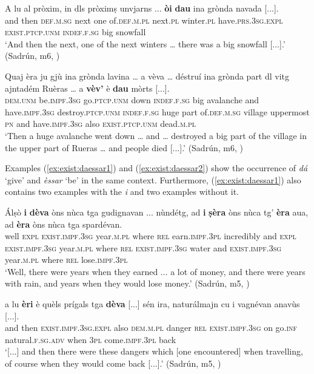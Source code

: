 \ea
\label{ex:exist.da5}
\gll    A lu al pròxim, in dls pròximṣ unvjarns ... \textbf{òi} \textbf{dau} ina grònda navada [...].\\
and then \textsc{def.m.sg} next one of.\textsc{def.m.pl} next.\textsc{pl} winter.\textsc{pl} {} have.\textsc{prs.3sg}.\textsc{expl} \textsc{exist.ptcp.unm} \textsc{indef.f.sg} big snowfall \\
\glt `And then the next, one of the next winters … there was a big snowfall [...].' (Sadrún, m6, )
\z

\ea
\label{ex:exist.da6}
\gll    Quaj èra ju gjù ina grònda lavina … a vèva … déstruí ina grònda part dl vitg ajntadém Ruèras … a \textbf{vèv’} è \textbf{dau} mòrts [...].\\
\textsc{dem.unm} be.\textsc{impf.3sg} go.\textsc{ptcp.unm} down \textsc{indef.f.sg} big avalanche {} and have.\textsc{impf.3sg} {} destroy.\textsc{ptcp.unm} \textsc{indef.f.sg} huge part of.\textsc{def.m.sg} village uppermost \textsc{pn} {} and have.\textsc{impf.3sg} also \textsc{exist.ptcp.unm} dead.\textsc{m.pl}\\
\glt `Then a huge avalanche went down … and … destroyed a big part of the village in the upper part of Rueras … and people died [...].' (Sadrún, m6, )
\z

Examples (\ref{ex:exist:daessar1}) and (\ref{ex:exist:daessar2}) show the occurrence of \textit{dá} `give' and \textit{èssar} `be' in the same context. Furthermore, (\ref{ex:exist:daessar1}) also contains two examples with the  \textit{i} and two examples without it.

\ea
\label{ex:exist:daessar1}
\gll Álṣò \textbf{i} \textbf{dèva} òns nùca tga gudignavan ... nùndétg, ad \textbf{i} \textbf{ṣèra} òns nùca tg’ \textbf{èra} aua, ad \textbf{èra} òns nùca tga spardévan.\\
well \textsc{expl} \textsc{exist.impf.3sg} year.\textsc{m.pl} where \textsc{rel} earn.\textsc{impf.3pl} {} incredibly and \textsc{expl} \textsc{exist.impf.3sg} year.\textsc{m.pl} where \textsc{rel} \textsc{exist.impf.3sg} water and \textsc{exist.impf.3sg} year.\textsc{m.pl} where \textsc{rel} lose.\textsc{impf.3pl} \\
\glt `Well, there were years when they earned ... a lot of money, and there were years with rain, and years when they would lose money.' (Sadrún, m5, )
\z

\ea
\label{ex:exist:daessar2}
\gll [...] a lu \textbf{èri} è quèls prígals tga \textbf{dèva} [...] sén ira, naturálmajn cu i vagnévan anavùs [...].\\
{} and then \textsc{exist.impf.3sg.expl} also \textsc{dem.m.pl} danger \textsc{rel} \textsc{exist.impf.3sg} {} on go.\textsc{inf} natural.\textsc{f.sg.adv} when \textsc{3pl} come.\textsc{impf.3pl} back\\
\glt `[...] and then there were these dangers which [one encountered] when travelling, of course when they would come back [...].' (Sadrún, m5, )
\z


